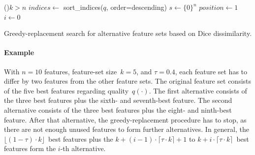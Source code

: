 \documentclass{article}
\theoremstyle{definition}
\begin{document}
\begin{algorithm}[htb]
	\DontPrintSemicolon
	\BlankLine
	\If(){$k > n$}{
		\Return{$\emptyset$}
	}
	$indices \leftarrow$ sort\_indices($q$, order=descending) 
	$s \leftarrow \{0\}^n$ 
	$position \leftarrow 1$ 
	$i \leftarrow 0$\ 
	\caption{Greedy-replacement search for alternative feature sets based on Dice dissimilarity.}
	\label{al:afs:greedy-replacement}
\end{algorithm}

\paragraph{Example}

With $n=10$ features, feature-set size~$k=5$, and $\tau=0.4$, each feature set has to differ by two features from the other feature sets.
The original feature set consists of the five best features regarding quality~$q(\cdot)$.
The first alternative consists of the three best features plus the sixth- and seventh-best feature.
The second alternative consists of the three best features plus the eight- and ninth-best feature.
After that alternative, the greedy-replacement procedure has to stop, as there are not enough unused features to form further alternatives.
In general, the $\lfloor (1 - \tau) \cdot k \rfloor$~best features plus the $k + (i-1) \cdot \lceil \tau \cdot k \rceil + 1$ to $k + i \cdot \lceil \tau \cdot k \rceil$~best features form the $i$-th alternative.
\end{document}
